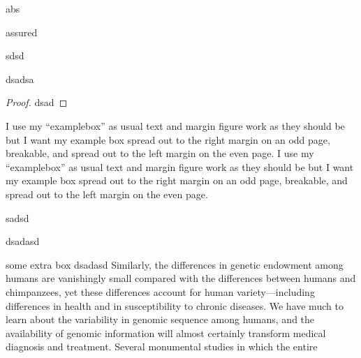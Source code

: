 \documentclass[]{subook}
\begin{document}
\lipsum[2]
\begin{theorem}[ad]
    abs
\end{theorem}

assured
\begin{lemma}[asd]
    sdsd
\end{lemma}


\lipsum[1]
\begin{postulate}
    dsadsa
\end{postulate}
\lipsum[4]
\begin{proof}
    dsad
\end{proof}
\lipsum[4-6]


\begin{examplebox}{}
    I use my ``examplebox'' as usual text and margin figure work as they should be but I want my example box spread out to the right margin on an odd page, breakable, and spread out to the left margin on the even page.
    \tcblower
    I use my ``examplebox'' as usual text and margin figure work as they should be but I want my example box spread out to the right margin on an odd page, breakable, and spread out to the left margin on the even page.
  \end{examplebox}

\lipsum[2-5]
\begin{corollary}
    sadsd
\end{corollary}
\lipsum[3]
\begin{proposition}[dsaf]
    dsadasd
\end{proposition}

\begin{tbox}{some extra box}
    dsadasd
    Similarly, the differences in genetic endowment among humans are vanishingly small compared with the differences between humans and chimpanzees, yet these differences account for human\citep{li2022limb} variety—including differences in health and in susceptibility to chronic diseases. We have much to learn about the variability in genomic sequence among humans, and the availability of genomic information will almost certainly transform medical diagnosis and treatment. Several monumental studies in which the entire
\end{tbox}
\end{document}
